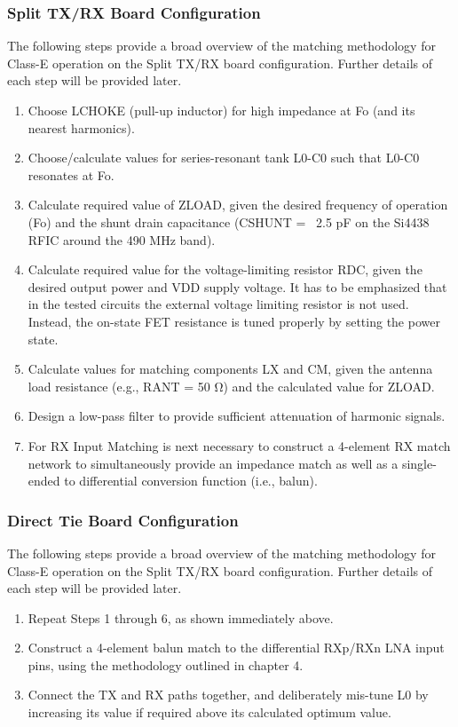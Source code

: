       \subsubsection{Split TX/RX Board Configuration}
        The following steps provide a broad overview of the matching methodology for Class-E operation on 
        the Split TX/RX board configuration. Further details of each step will be provided later.
        \begin{enumerate}[noitemsep]
          \item Choose LCHOKE (pull-up inductor) for high impedance at Fo (and its nearest harmonics).
          \item Choose/calculate values for series-resonant tank L0-C0 such that L0-C0 resonates at Fo.
          \item Calculate required value of ZLOAD, given the desired frequency of operation (Fo) and the 
                shunt drain capacitance (CSHUNT = ~2.5 pF on the Si4438 RFIC around the 490 MHz band).
          \item Calculate required value for the voltage-limiting resistor RDC, given the desired output 
                power and VDD supply voltage. It has to be emphasized that in the tested circuits the 
                external voltage limiting resistor is not used. Instead, the on-state FET resistance is tuned 
                properly by setting the power state.
          \item Calculate values for matching components LX and CM, given the antenna load resistance 
                (e.g., RANT = 50 Ω) and the calculated value for ZLOAD.
          \item Design a low-pass filter to provide sufficient attenuation of harmonic signals.
          \item For RX Input Matching is next necessary to construct a 4-element RX match network to 
                simultaneously provide an impedance match as well as a single-ended to differential 
                conversion function (i.e., balun).
        \end{enumerate}

      \subsubsection{Direct Tie Board Configuration}
        The following steps provide a broad overview of the matching methodology for Class-E operation on 
        the Split TX/RX board configuration. Further details of each step will be provided later.
        \begin{enumerate}[noitemsep]
          \item Repeat Steps 1 through 6, as shown immediately above.
          \item Construct a 4-element balun match to the differential RXp/RXn LNA input pins, using the 
                methodology outlined in chapter 4.
          \item Connect the TX and RX paths together, and deliberately mis-tune L0 by increasing its value 
                if required above its calculated optimum value.
        \end{enumerate}
    

